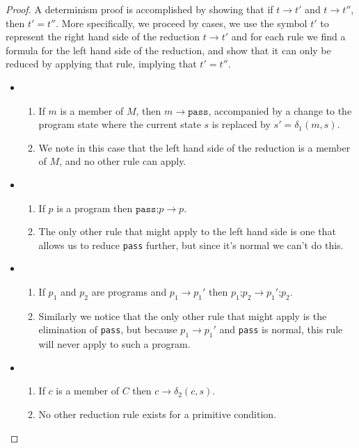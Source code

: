 \documentclass[11pt]{article}
\begin{document}
\begin{proof}

A determinism proof is accomplished by showing that if $t \rightarrow t'$ and $t \rightarrow t''$, then $t' = t''$.  More specifically, we proceed by cases, we use the symbol $t'$ to represent the right hand side of the reduction $t \rightarrow t'$ and for each rule we find a formula for the left hand side of the reduction, and show that it can only be reduced by applying that rule, implying that $t' = t''$.

\begin{itemize}

\item
\begin{enumerate}
\item If $m$ is a member of $M$, then $m \rightarrow \texttt{pass}$, accompanied by a change to the program state where the current state $s$ is replaced by $s' = \delta_{1}(m, s)$.
\item We note in this case that the left hand side of the reduction is a member of $M$, and no other rule can apply.
\end{enumerate}

\item
\begin{enumerate}
\item If $p$ is a program then $\texttt{pass;}p \rightarrow p$.
\item The only other rule that might apply to the left hand side is one that allows us to reduce \texttt{pass} further, but since it's normal we can't do this.
\end{enumerate}

\item
\begin{enumerate}
\item If $p_{1}$ and $p_{2}$ are programs and $p_{1} \rightarrow p_{1}'$ then $p_{1}\texttt{;}p_{2} \rightarrow p_{1}'\texttt{;}p_{2}$.
\item Similarly we notice that the only other rule that might apply is the elimination of \texttt{pass}, but because $p_{1} \rightarrow p_{1}'$ and \texttt{pass} is normal, this rule will never apply to such a program.
\end{enumerate}

\item
\begin{enumerate}
\item If $c$ is a member of $C$ then $c \rightarrow \delta_{2}(c, s)$.
\item No other reduction rule exists for a primitive condition.
\end{enumerate}


\end{itemize}
\end{proof}
\end{document}
